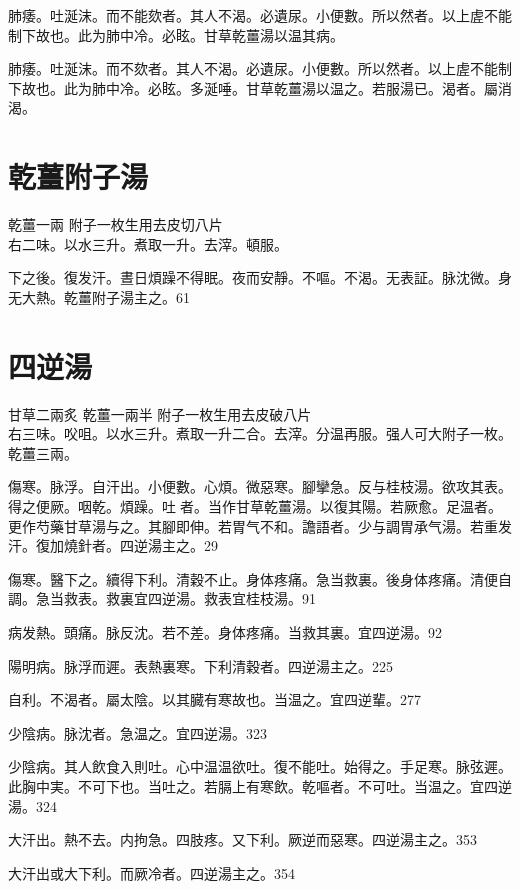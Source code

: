 肺痿。吐涎沫。而不能欬者。其人不渴。必遺尿。小便數。所以然者。以上虗不能制下故也。此为肺中冷。必眩。甘草乾薑湯以温其病。{\wuben}

肺痿。吐涎沫。而不欬者。其人不渴。必遺尿。小便數。所以然者。以上虗不能制下故也。此为肺中冷。必眩。多涎唾。甘草乾薑湯以温之。若服湯已。渴者。屬消渴。{\dengben}

\section{乾薑附子湯}

乾薑{\scriptsize 一兩} 附子{\scriptsize 一枚生用去皮切八片}\\
右二味。以水三升。煮取一升。去滓。頓服。

下之後。復发汗。晝日煩躁不得眠。夜而安靜。不嘔。不渴。无表証。脉沈微。身无大熱。乾薑附子湯主之。61

\section{四逆湯}

甘草{\scriptsize 二兩炙} 乾薑{\scriptsize 一兩半} 附子{\scriptsize 一枚生用去皮破八片}\\
右三味。{\khaaitp 㕮咀。}以水三升。煮取一升二合。去滓。分温再服。强人可大附子一枚。乾薑三兩。

傷寒。脉浮。自汗出。小便數。心煩。微惡寒。腳攣急。反与桂枝湯。欲攻其表。得之便厥。咽乾。煩躁。吐{\sungtpii 𠱘}者。当作甘草乾薑湯。以復其陽。若厥愈。足温者。更作芍藥甘草湯与之。其腳即伸。若胃气不和。譫語者。少与{\khaaitp 調胃}承气湯。若重发汗。復加燒針者。四逆湯主之。29

傷寒。醫下之。續得下利。清穀不止。身体疼痛。急当救裏。後身体疼痛。清便自調。急当救表。救裏宜四逆湯。救表宜桂枝湯。91

病发熱。頭痛。脉反沈。若不差。身体疼痛。当救其裏。宜四逆湯。92

{\khaaitp 陽明病。}脉浮而遲。表熱裏寒。下利清穀者。四逆湯主之。225

自利。不渴者。屬太陰。以其臓有寒故也。当温之。宜四逆輩。277

少陰病。脉沈者。急温之。宜四逆湯。323

少陰病。其人飲食入則吐。心中温温欲吐。復不能吐。始得之。手足寒。脉弦遲。此胸中実。不可下也。当吐之。若膈上有寒飲。乾嘔者。不可吐。当温之。宜四逆湯。324

大汗出。熱不去。内拘急。四肢疼。{\khaaitp 又}下利。厥逆而惡寒。四逆湯主之。353

大汗{\khaaitp 出}或大下利。而厥冷者。四逆湯主之。354

